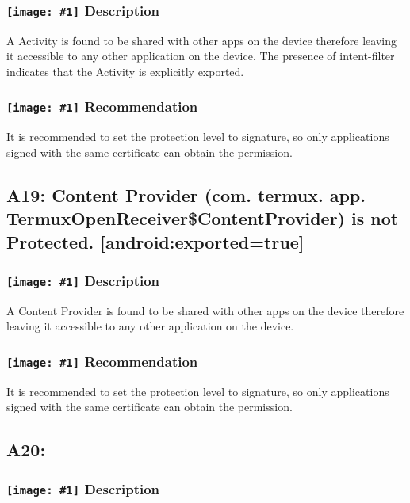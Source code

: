 \documentclass[12p]{article}
\newcommand{\icon}[1]{\texttt{[image: \#1]}}
\begin{document}
\subsubsection*{\protect\icon{/home/miki/Documents/GITHUB/AndroidPermissions/python/vulns/report_icons/basic_sheet.png} Description}
A Activity is found to be shared with other apps on the device therefore leaving it accessible to any other application on the device. The presence of intent-filter indicates that the Activity is explicitly exported.
\subsubsection*{\protect\icon{/home/miki/Documents/GITHUB/AndroidPermissions/python/vulns/report_icons/basic_todo.png} Recommendation}
It is recommended to set the protection level to signature, so only applications signed with the same certificate can obtain the permission.
\subsection{A19: Content Provider (com. termux. app. TermuxOpenReceiver\$ContentProvider) is not Protected. [android:exported=true]}
\subsubsection*{\protect\icon{/home/miki/Documents/GITHUB/AndroidPermissions/python/vulns/report_icons/basic_sheet.png} Description}
A Content Provider is found to be shared with other apps on the device therefore leaving it accessible to any other application on the device.
\subsubsection*{\protect\icon{/home/miki/Documents/GITHUB/AndroidPermissions/python/vulns/report_icons/basic_todo.png} Recommendation}
It is recommended to set the protection level to signature, so only applications signed with the same certificate can obtain the permission.
\subsection{A20: }
\subsubsection*{\protect\icon{/home/miki/Documents/GITHUB/AndroidPermissions/python/vulns/report_icons/basic_sheet.png} Description}
\end{document}
